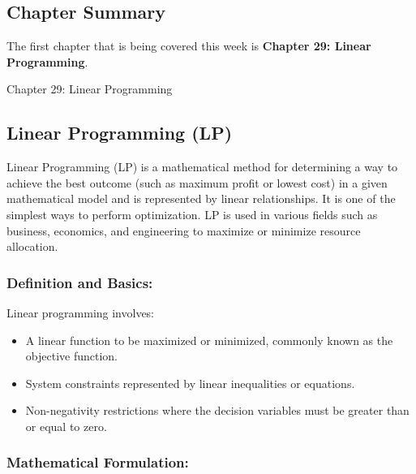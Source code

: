 \subsection{Chapter Summary}

The first chapter that is being covered this week is \textbf{Chapter 29: Linear Programming}.

\begin{notes}{Chapter 29: Linear Programming}
    \subsection*{Linear Programming (LP)}

    Linear Programming (LP) is a mathematical method for determining a way to achieve the best outcome (such as maximum profit or lowest cost) in a given mathematical model and is represented by 
    linear relationships. It is one of the simplest ways to perform optimization. LP is used in various fields such as business, economics, and engineering to maximize or minimize resource allocation. \vspace*{1em}
    
    \subsubsection*{Definition and Basics:}
    
    Linear programming involves:
    \begin{itemize}
        \item A linear function to be maximized or minimized, commonly known as the objective function.
        \item System constraints represented by linear inequalities or equations.
        \item Non-negativity restrictions where the decision variables must be greater than or equal to zero.
    \end{itemize}
    
    \subsubsection*{Mathematical Formulation:}
    

\end{notes}

